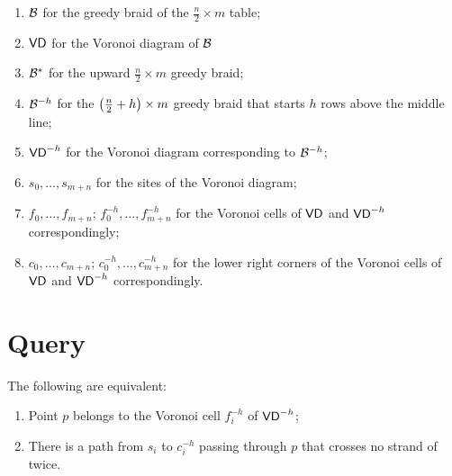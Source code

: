 \documentclass[a4paper,11pt]{article}
\begin{document}
\begin{enumerate}
	\item \(\braid\) for the greedy braid of the \(\frac{n}{2} \times m\) table;
	\item \(\VD\) for the Voronoi diagram of \(\braid\) %
	\item \(\braid^*\) for the upward \(\frac{n}{2} \times m\) greedy braid;
	\item \(\braid^{-h}\) for the \(\lr*{\frac{n}{2} + h} \times m\) greedy braid that starts \(h\) rows above the middle line;
	\item \(\VD^{-h}\) for the Voronoi diagram corresponding to \(\braid^{-h}\);
	\item \(s_0, \ldots, s_{m+n}\) for the sites of the Voronoi diagram;
	\item \(f_0, \ldots, f_{m+n}\); \(f_0^{-h}, \ldots, f_{m+n}^{-h}\) for the Voronoi cells of \(\VD\) and \(\VD^{-h}\) correspondingly;
	\item \(c_0, \ldots, c_{m+n}\); \(c_0^{-h}, \ldots, c_{m+n}^{-h}\) for the lower right corners of the Voronoi cells of \(\VD\) and \(\VD^{-h}\) correspondingly.
\end{enumerate}

\section{Query}

\begin{lemma}
	The following are equivalent:
   \begin{enumerate}
	\item Point \(p\) belongs to the Voronoi cell \(f_i^{-h}\) of \(\VD^{-h}\);
	\item There is a path from \(s_i\) to \(c_i^{-h}\) passing through \(p\) that crosses no strand of \braid twice.
   \end{enumerate}
\end{lemma}

\begin{figure}[ht] \centering
	

	
\end{figure}

%
\end{document}
